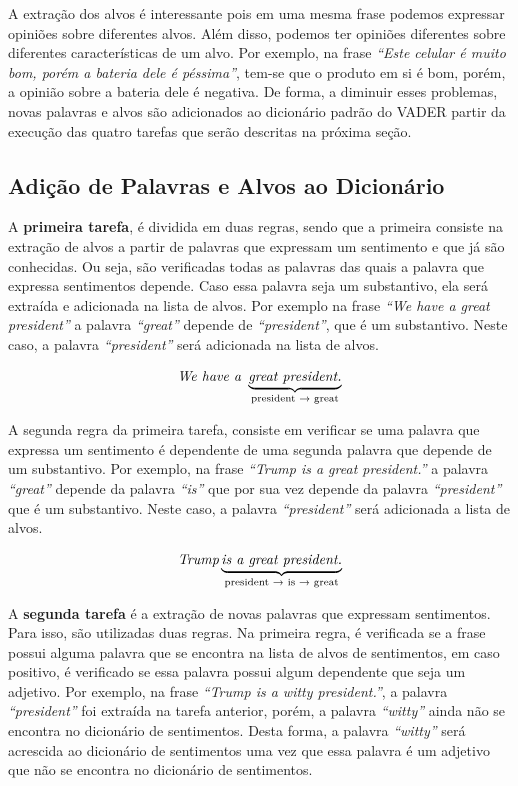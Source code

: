 A extração dos alvos é interessante pois em uma mesma frase
podemos expressar opiniões sobre diferentes alvos. Além disso, podemos
ter opiniões diferentes sobre diferentes características de um alvo. Por
exemplo, na frase \textit{``Este celular é muito bom, porém a bateria dele é
péssima''}, tem-se que o produto em si é bom, porém, a opinião sobre a bateria
dele é negativa. De forma, a diminuir esses problemas, novas palavras e alvos
são adicionados ao dicionário padrão do \ac{VADER} partir da execução das quatro
tarefas que serão descritas na próxima seção.

\subsection{Adição de Palavras e Alvos ao Dicionário}

A \textbf{primeira tarefa}, é dividida em duas regras, sendo que a primeira
consiste na extração de alvos a partir de palavras que expressam um sentimento e
que já são conhecidas. Ou seja, são verificadas todas as palavras das quais a palavra que
expressa sentimentos depende. Caso essa palavra seja um substantivo, ela será
extraída e adicionada na lista de alvos. Por exemplo na frase \textit{``We have
a great president''} a palavra \textit{``great''} depende de \textit{``president''}, que é um substantivo. Neste caso, a palavra \textit{``president''} será adicionada na lista de alvos.

\[\textit{We have a } \underbrace{\textit{great president.}}_\text{president
\textrightarrow \text{ great}}\]

A segunda regra da primeira tarefa,
consiste em verificar se uma palavra que expressa um sentimento é dependente de
uma segunda palavra que depende de um substantivo.
Por exemplo, na frase \textit{``Trump is a great president.''} a palavra
\textit{``great''} depende da palavra \textit{``is''} que por sua vez depende da
palavra \textit{``president''} que é um substantivo. Neste caso, a palavra
\textit{``president''} será adicionada a lista de alvos.

\[\textit{Trump} \underbrace{\textit{is a great president.}}_\text{president
\textrightarrow \text{ is} \textrightarrow \text{ great}}\]

A \textbf{segunda tarefa} é a extração de novas palavras que expressam
sentimentos. Para isso, são utilizadas duas regras. Na primeira regra, é
verificada se a frase possui alguma palavra que se encontra na lista de alvos de
sentimentos, em caso positivo, é verificado se essa palavra possui algum dependente que seja um adjetivo. Por exemplo, na frase \textit{``Trump is a witty president.''}, a palavra \textit{``president''} foi
extraída na tarefa anterior, porém, a palavra \textit{``witty''} ainda não se
encontra no dicionário de sentimentos.
Desta forma, a palavra \textit{``witty''} será acrescida ao
dicionário de sentimentos uma vez que essa palavra é um adjetivo que não se
encontra no dicionário de sentimentos.



